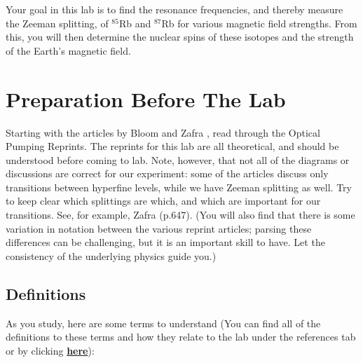\documentclass{../lab}
\newcommand{\DefinitionsOPT}{http://experimentationlab.berkeley.edu/definitionsopt}
\begin{document}
Your goal in this lab is to find the resonance frequencies, and thereby measure the Zeeman splitting, of $^{85}$Rb and $^{87}$Rb for various magnetic field strengths. From this, you will then determine the nuclear spins of these isotopes and the strength of the Earth's magnetic field.

\section{Preparation Before The Lab}

Starting with the articles by Bloom \cite{Bloom} and Zafra \cite{Zafra}, read through the Optical Pumping Reprints. The reprints for this lab are all theoretical, and should be understood before coming to lab. Note, however, that not all of the diagrams or discussions are correct for our experiment: some of the articles discuss only transitions between hyperfine levels, while we have Zeeman splitting as well. Try to keep clear which splittings are which, and which are important for our transitions. See, for example, Zafra \cite{Zafra} (p.647). (You will also find that there is some variation in notation between the various reprint articles; parsing these differences can be challenging, but it is an important skill to have. Let the consistency of the underlying physics guide you.)

\subsection{Definitions}

As you study, here are some terms to understand (You can find all of the definitions to these terms and how they relate to the lab under the references tab or by clicking \href{\DefinitionsOPT}{\textbf{here}}):
\end{document}
